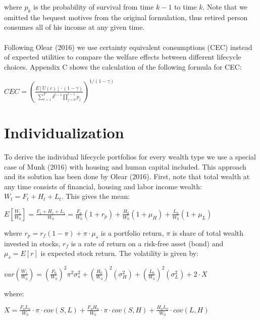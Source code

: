 where $p_k$ is the probability of survival from time $k-1$ to time $k$. Note that we omitted the bequest motives from the original formulation, thus retired person consumes all of his income at any given time.

\paragraph*{}Following Olear (2016) we use certainty equivalent consumptions (CEC) instead of expected utilities to compare the welfare effects between different lifecycle choices. Appendix C shows the calculation of the following formula for CEC:

\begin{center}
	$CEC = \left( \frac{E[U(c)]\cdot(1-\gamma)}{\sum^T_{t=1} \delta^{t-1} \prod^{t-1}_{j=0} p_j} \right)^{1/(1-\gamma)}$
\end{center}


\section{Individualization}

To derive the individual lifecycle portfolios for every wealth type we use a special case of Munk (2016) with housing and human capital included. This approach and its solution has been done by Olear (2016). First, note that total wealth at any time consists of financial, housing and labor income wealth: $W_t = F_t + H_t + L_t$. This gives the mean:

\begin{center}
	$E[\frac{W_1}{W_0}] = \frac{F_1 + H_1 + L_1}{W_0} =  \frac{F_0}{W_0} (1 + r_p) + \frac{H_0}{W_0}(1+\mu_H) + \frac{L_0}{W_0}(1+\mu_L)$
\end{center}

where $r_p = r_f(1-\pi) + \pi \cdot \mu_s$ is a portfolio return, $\pi$ is share of total wealth invested in stocks, $r_f$ is a rate of return on a risk-free asset (bond) and $\mu_s = E[r]$ is expected stock return. The volatility is given by:

\begin{center}
	$var(\frac{W_1}{W_0}) = (\frac{F_0}{W_0})^2 \pi^2 \sigma^2_s + (\frac{H_0}{W_0})^2(\sigma^2_H) + (\frac{L_0}{W_0})^2(\sigma^2_L) + 2 \cdot X$
\end{center}

where:

\begin{center}
	$X = \frac{F_0 L_0}{W_0} \cdot \pi\cdot cov(S,L) + \frac{F_0 H_0}{W_0} \cdot \pi\cdot cov(S,H) + \frac{H_0 L_0}{W_0} \cdot cov(L,H)$
\end{center}


